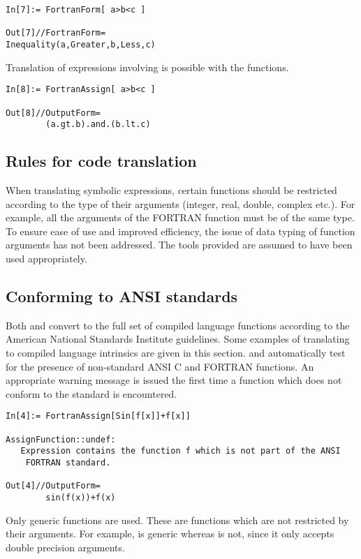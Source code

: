 \documentclass [12pt,twoside]{article}
\begin{document}
\begin{verbatim}
In[7]:= FortranForm[ a>b<c ]

Out[7]//FortranForm=
Inequality(a,Greater,b,Less,c)
\end{verbatim}
Translation of expressions involving  is possible with
the  functions.

\begin{verbatim}
In[8]:= FortranAssign[ a>b<c ]

Out[8]//OutputForm=
        (a.gt.b).and.(b.lt.c)
\end{verbatim}

\pagebreak[2]

\subsection{Rules for code translation}\label{codetrans}

When translating symbolic expressions, certain functions should be
restricted according to the type of their arguments (integer, real,
double, complex etc.). For example, all the arguments of the FORTRAN
function  must be of the same type. To ensure ease of use and
improved efficiency, the issue of data typing of function arguments has
not been addressed. The tools provided are assumed to have been used
appropriately.

\subsection{Conforming to ANSI standards}

Both  and  convert to the full set of
compiled language functions according to the American National Standards
Institute guidelines. Some examples of translating to compiled
language intrinsics are given in this section.
 and  automatically test for the presence
of non-standard ANSI C and FORTRAN functions. An appropriate warning
message is issued the first time a function which does not
conform to the standard is encountered.
\begin{verbatim}
In[4]:= FortranAssign[Sin[f[x]]+f[x]]

AssignFunction::undef: 
   Expression contains the function f which is not part of the ANSI 
    FORTRAN standard.

Out[4]//OutputForm=
        sin(f(x))+f(x)
\end{verbatim}
Only generic functions are used. These are functions which are not restricted by their
arguments. For example,  is generic whereas  is not, since it only accepts
double precision arguments.
\end{document}
